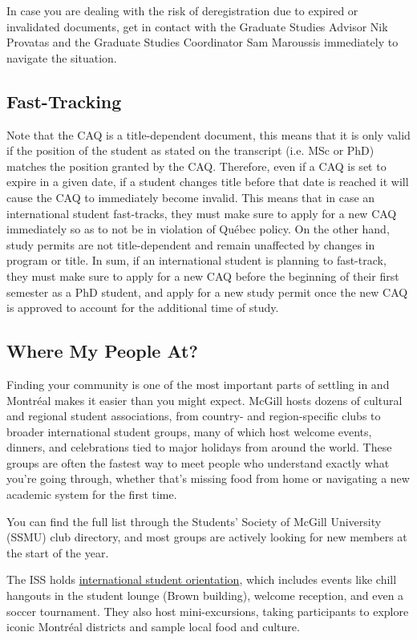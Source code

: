 In case you are dealing with the risk of deregistration due to expired or invalidated documents, get in contact with the Graduate Studies Advisor Nik Provatas and the Graduate Studies Coordinator Sam Maroussis immediately to navigate the situation.

\subsection*{Fast-Tracking}
Note that the CAQ is a title-dependent document, this means that it is only valid if the position of the student as stated on the transcript (i.e. MSc or PhD) matches the position granted by the CAQ. Therefore, even if a CAQ is set to expire in a given date, if a student changes title before that date is reached it will cause the CAQ to immediately become invalid. This means that in case an international student fast-tracks, they must make sure to apply for a new CAQ immediately so as to not be in violation of Québec policy. On the other hand, study permits are not title-dependent and remain unaffected by changes in program or title. In sum, if an international student is planning to fast-track, they must make sure to apply for a new CAQ before the beginning of their first semester as a PhD student, and apply for a new study permit once the new CAQ is approved to account for the additional time of study.

\subsection{Where My People At?}
Finding your community is one of the most important parts of settling in and Montr\'eal makes it easier than you might expect. McGill hosts dozens of cultural and regional student associations, from country- and region-specific clubs to broader international student groups, many of which host welcome events, dinners, and celebrations tied to major holidays from around the world. These groups are often the fastest way to meet people who understand exactly what you're going through, whether that's missing food from home or navigating a new academic system for the first time.

You can find the full list through the Students' Society of McGill University (SSMU) club directory, and most groups are actively looking for new members at the start of the year. 

The ISS holds \href{https://www.mcgill.ca/internationalstudents/pre-arrival/orientation}{international student orientation}, which includes events like chill hangouts in the student lounge (Brown building), welcome reception, and even a soccer tournament. They also host mini-excursions, taking participants to explore iconic Montréal districts and sample local food and culture.

